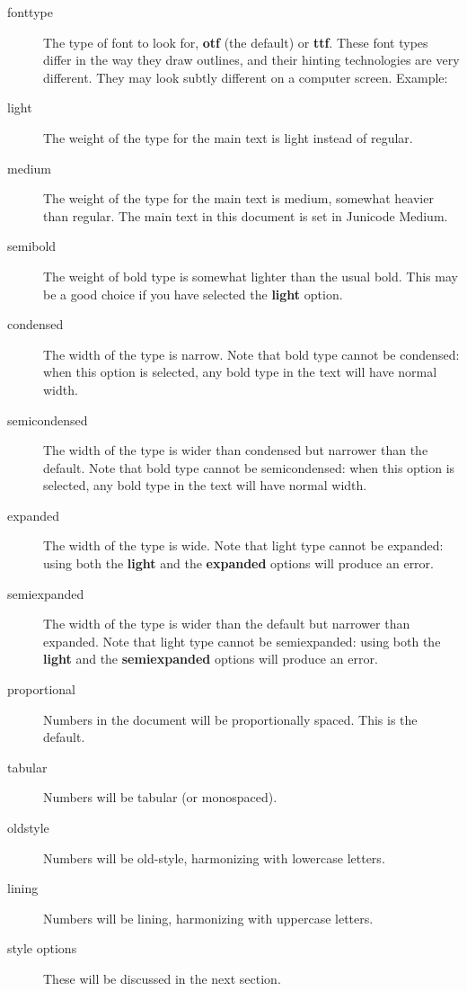 \documentclass{article}
\begin{document}
\begin{description}
\item[fonttype] The type of font to look for, \textbf{otf} (the default) or \textbf{ttf}.
These font types differ in the
way they draw outlines, and their hinting technologies are very different. They may look subtly
different on a computer screen. Example:\\
\hspace*{1in}{\verb|\usepackage[fonttype=ttf]{Junicode}|}
\item[light] The weight of the type for the main text is light instead of regular.
\item[medium] The weight of the type for the main text is medium, somewhat heavier than regular.
The main text in this document is set in Junicode Medium.
\item[semibold] The weight of bold type is somewhat lighter than the usual bold. This may be a
good choice if you have selected the \textbf{light} option.
\item[condensed] The width of the type is narrow. Note that bold type cannot be condensed: when
this option is selected, any bold type in the text will have normal width.
\item[semicondensed] The width of the type is wider than condensed but narrower than the default.
Note that bold type cannot be semicondensed: when this option is selected, any bold type in the
text will have normal width.
\item[expanded] The width of the type is wide. Note that light type cannot be expanded: using
both the \textbf{light} and the \textbf{expanded} options will produce an error.
\item[semiexpanded] The width of the type is wider than the default but narrower than expanded.
Note that light type cannot be semiexpanded: using both the \textbf{light} and the \textbf{semiexpanded} options
will produce an error.
\item[proportional] Numbers in the document will be proportionally spaced. This is the default.
\item[tabular] Numbers will be tabular (or monospaced).
\item[oldstyle] Numbers will be old-style, harmonizing with lowercase letters.
\item[lining] Numbers will be lining, harmonizing with uppercase letters.
\item[style options] These will be discussed in the next section.
\end{description}
\end{document}
